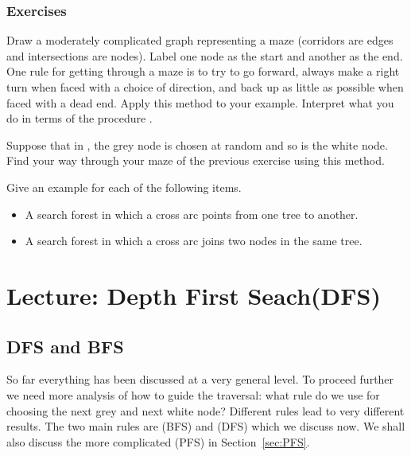\subsection*{Exercises}

\begin{Exercise}
\label{ex:trav-maze}
Draw a moderately complicated graph representing a maze (corridors are
edges and intersections are nodes). Label one node as the start and
another as the end.  One rule for getting through a maze is to  try to
go forward, always make a right turn when faced with a choice of
direction, and back up as little as possible when faced with a dead end.
Apply this method to your example. Interpret what you do in terms of the
procedure .
\end{Exercise}

\begin{Exercise}
\label{ex:trav-maze-random}
Suppose that in , the grey node is chosen at random and
so is the white node. Find your way through your maze of the previous
exercise using this method.
\end{Exercise}

\begin{Exercise}
\label{ex:trav-cross}
Give an example for each of the following items.
\begin{itemize}
\item A search forest in which a cross arc points from one tree to 
another.
\item A  search forest in which a cross arc joins two nodes in the same
tree.
\end{itemize}
\end{Exercise}

\chapter{Lecture: Depth First Seach(DFS)}

\section{DFS and BFS}
\label{sec:BFSDFS}

So far everything has been discussed at a very general level. To proceed
further we need more analysis of how to guide the traversal: what rule do
we use for choosing the next grey and next white node? Different rules lead
to very different results. The two main rules are  (BFS) and  (DFS) which we discuss now.
We shall also discuss the more complicated  (PFS) in Section~\ref{sec:PFS}.

